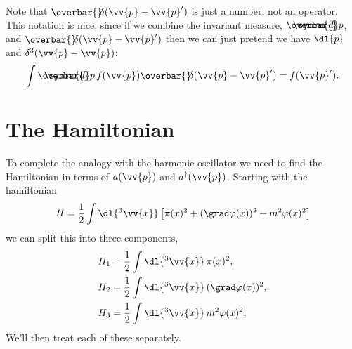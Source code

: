 \documentclass[fleqn]{NotesClass}
\newcommand{\hermit}{{\dagger}}
\newcommand{\dbar}[1][0.0]{\ThisStyle{\ensurestackMath{%
            \stackengine{#1\LMex}{\SavedStyle \symrm{d}}{\SavedStyle\overbar{}%
                \mkern2.25mu}{O}{r}{F}{F}{L}}}}
\newcommand{\invariantmeasure}[1]{%
    \mathchoice{\dbar #1}{\dbar #1}{\dbar[.05] #1}{\dbar[.06] #1}
}
\newcommand\bardelta{\ThisStyle{\ensurestackMath{%
            \stackengine{-.3\LMpt}{\SavedStyle \delta}{\SavedStyle\overbar{}%
                \mkern4.5mu}{O}{r}{F}{F}{L}}}}
\begin{document}
    Note that \(\bardelta(\vv{p} - \vv{p}')\) is just a number, not an operator.
    This notation is nice, since if we combine the invariant measure, \(\invariantmeasure{p}\), and \(\bardelta(\vv{p} - \vv{p}')\) then we can just pretend we have \(\dl{p}\) and \(\delta^3(\vv{p} - \vv{p})\):
    \begin{equation}
        \int \invariantmeasure{p} \, f(\vv{p}) \bardelta(\vv{p} - \vv{p}') = f(\vv{p}').
    \end{equation}
    
    \section{The Hamiltonian}\label{sec:the hamiltonian}
    To complete the analogy with the harmonic oscillator we need to find the Hamiltonian in terms of \(a(\vv{p})\) and \(a^\hermit(\vv{p})\).
    Starting with the hamiltonian
    \begin{equation}
        H = \frac{1}{2} \int \dl{^3\vv{x}} \left[ \pi(x)^2 + (\grad \varphi(x))^2 + m^2 \varphi(x)^2 \right]
    \end{equation}
    we can split this into three components,
    \begin{align}
        H_1 &= \frac{1}{2}\int \dl{^3\vv{x}} \, \pi(x)^2,\\
        H_2 &= \frac{1}{2}\int \dl{^3\vv{x}} \, (\grad\varphi(x))^2,\\
        H_3 &= \frac{1}{2}\int \dl{^3\vv{x}} \, m^2\varphi(x)^2,\\
    \end{align}
    We'll then treat each of these separately.
    
\end{document}
